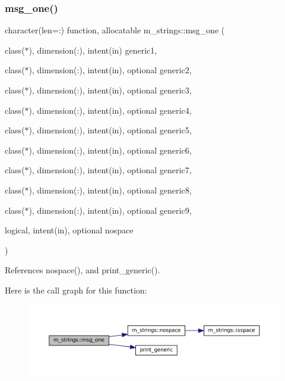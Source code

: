 \subsubsection{\texorpdfstring{msg\+\_\+one()}{msg\_one()}}
{\footnotesize\ttfamily character(len=\+:) function, allocatable m\+\_\+strings\+::msg\+\_\+one (\begin{DoxyParamCaption}\item[{class($\ast$), dimension(\+:), intent(in)}]{generic1,  }\item[{class($\ast$), dimension(\+:), intent(in), optional}]{generic2,  }\item[{class($\ast$), dimension(\+:), intent(in), optional}]{generic3,  }\item[{class($\ast$), dimension(\+:), intent(in), optional}]{generic4,  }\item[{class($\ast$), dimension(\+:), intent(in), optional}]{generic5,  }\item[{class($\ast$), dimension(\+:), intent(in), optional}]{generic6,  }\item[{class($\ast$), dimension(\+:), intent(in), optional}]{generic7,  }\item[{class($\ast$), dimension(\+:), intent(in), optional}]{generic8,  }\item[{class($\ast$), dimension(\+:), intent(in), optional}]{generic9,  }\item[{logical, intent(in), optional}]{nospace }\end{DoxyParamCaption})\hspace{0.3cm}{\ttfamily [private]}}



References nospace(), and print\+\_\+generic().

Here is the call graph for this function\+:
\nopagebreak
\begin{figure}[H]
\begin{center}
\leavevmode
\includegraphics[width=350pt]{namespacem__strings_a52d27df9dcea52039c6feccb782ec4fd_cgraph}
\end{center}
\end{figure}
\mbox{\label{namespacem__strings_a926d1d9f529487149f4e0a1de8294122}} 
